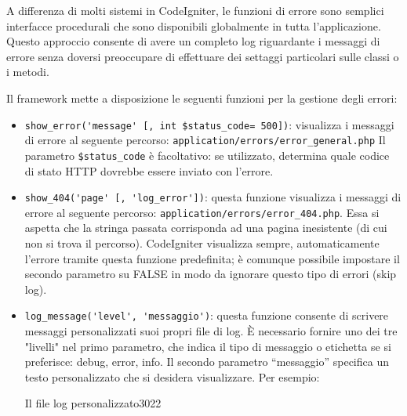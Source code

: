 A differenza di molti sistemi in CodeIgniter, le funzioni di errore sono semplici interfacce procedurali che sono disponibili globalmente in tutta l'applicazione. Questo approccio consente di avere un completo log riguardante i messaggi di errore senza doversi preoccupare di effettuare dei settaggi particolari sulle classi o i metodi.

Il framework mette a disposizione le seguenti funzioni per la gestione degli errori:

\begin{itemize}
\item \verb|show_error('message' [, int $status_code= 500])|: visualizza i messaggi di errore al seguente percorso: \verb|application/errors/error_general.php| Il parametro \verb|$status_code| è facoltativo: se utilizzato, determina quale codice di stato HTTP dovrebbe essere inviato con l'errore.

\item \verb|show_404('page' [, 'log_error'])|: questa funzione visualizza i messaggi di errore al seguente percorso: \verb|application/errors/error_404.php|. Essa si aspetta che la stringa passata corrisponda ad una pagina inesistente (di cui non si trova il percorso). CodeIgniter visualizza sempre, automaticamente l'errore tramite questa funzione predefinita; è comunque possibile impostare il secondo parametro su FALSE in modo da ignorare questo tipo di errori (skip log).

\item \verb|log_message('level', 'messaggio')|: questa funzione consente di scrivere messaggi personalizzati suoi propri file di log. È necessario fornire uno dei tre "livelli" nel primo parametro, che indica il tipo di messaggio o etichetta se si preferisce: debug, error, info. Il secondo parametro ``messaggio'' specifica un testo personalizzato che si desidera visualizzare. Per esempio:


\begin{img}{Il file log personalizzato}{3}{022}
\end{img}


\end{itemize}
